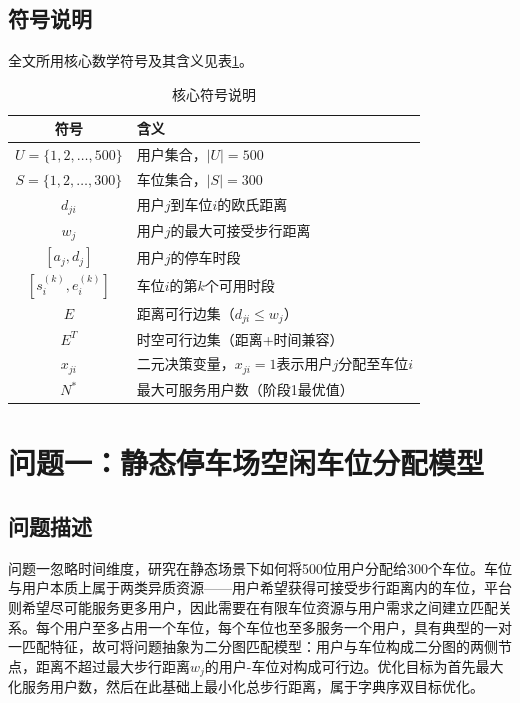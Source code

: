 \documentclass[12pt,a4paper]{ctexart}
\begin{document}
\subsection{符号说明}

全文所用核心数学符号及其含义见表\ref{tab:notation}。

\begin{table}[H]
  \centering
  \caption{核心符号说明}
  \label{tab:notation}
  \begin{tabular}{c|l}
    \toprule
    符号 & 含义 \\
    \midrule
    $U = \{1,2,\ldots,500\}$ & 用户集合，$|U|=500$ \\
    $S = \{1,2,\ldots,300\}$ & 车位集合，$|S|=300$ \\
    $d_{ji}$ & 用户$j$到车位$i$的欧氏距离 \\
    $w_j$ & 用户$j$的最大可接受步行距离 \\
    $[a_j, d_j]$ & 用户$j$的停车时段 \\
    $[s_i^{(k)}, e_i^{(k)}]$ & 车位$i$的第$k$个可用时段 \\
    $E$ & 距离可行边集（$d_{ji} \leq w_j$） \\
    $E^T$ & 时空可行边集（距离+时间兼容） \\
    $x_{ji}$ & 二元决策变量，$x_{ji}=1$表示用户$j$分配至车位$i$ \\
    $N^*$ & 最大可服务用户数（阶段1最优值） \\
    \bottomrule
  \end{tabular}
\end{table}


\section{问题一：静态停车场空闲车位分配模型}

\subsection{问题描述}

问题一忽略时间维度，研究在静态场景下如何将500位用户分配给300个车位。车位与用户本质上属于两类异质资源——用户希望获得可接受步行距离内的车位，平台则希望尽可能服务更多用户，因此需要在有限车位资源与用户需求之间建立匹配关系。每个用户至多占用一个车位，每个车位也至多服务一个用户，具有典型的一对一匹配特征，故可将问题抽象为二分图匹配模型：用户与车位构成二分图的两侧节点，距离不超过最大步行距离$w_j$的用户-车位对构成可行边。优化目标为首先最大化服务用户数，然后在此基础上最小化总步行距离，属于字典序双目标优化。
\end{document}
